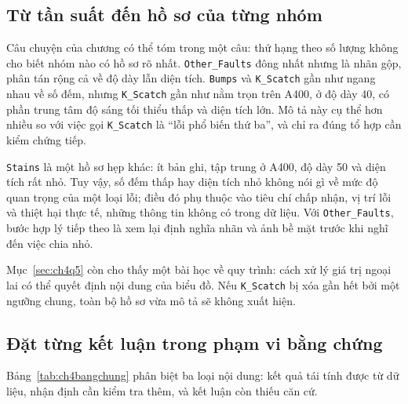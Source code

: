 \documentclass[12pt,a4paper,oneside]{report}
\newcommand{\maCot}[1]{{\urlstyle{tt}\def\UrlBreaks{\do\_\do\/\do\.}\def\UrlBigBreaks{}\nolinkurl{#1}}}
\begin{document}
\subsection{Từ tần suất đến hồ sơ của từng nhóm}

Câu chuyện của chương có thể tóm trong một câu: thứ hạng theo số lượng không cho biết nhóm nào có hồ sơ rõ nhất. \maCot{Other_Faults} đông nhất nhưng là nhãn gộp, phân tán rộng cả về độ dày lẫn diện tích. \maCot{Bumps} và \maCot{K_Scatch} gần như ngang nhau về số đếm, nhưng \maCot{K_Scatch} gần như nằm trọn trên A400, ở độ dày 40, có phần trung tâm độ sáng tối thiểu thấp và diện tích lớn. Mô tả này cụ thể hơn nhiều so với việc gọi \maCot{K_Scatch} là ``lỗi phổ biến thứ ba'', và chỉ ra đúng tổ hợp cần kiểm chứng tiếp.

\maCot{Stains} là một hồ sơ hẹp khác: ít bản ghi, tập trung ở A400, độ dày 50 và diện tích rất nhỏ. Tuy vậy, số đếm thấp hay diện tích nhỏ không nói gì về mức độ quan trọng của một loại lỗi; điều đó phụ thuộc vào tiêu chí chấp nhận, vị trí lỗi và thiệt hại thực tế, những thông tin không có trong dữ liệu. Với \maCot{Other_Faults}, bước hợp lý tiếp theo là xem lại định nghĩa nhãn và ảnh bề mặt trước khi nghĩ đến việc chia nhỏ.

Mục~\ref{sec:ch4q5} còn cho thấy một bài học về quy trình: cách xử lý giá trị ngoại lai có thể quyết định nội dung của biểu đồ. Nếu \maCot{K_Scatch} bị xóa gần hết bởi một ngưỡng chung, toàn bộ hồ sơ vừa mô tả sẽ không xuất hiện.

\subsection{Đặt từng kết luận trong phạm vi bằng chứng}

Bảng~\ref{tab:ch4bangchung} phân biệt ba loại nội dung: kết quả tái tính được từ dữ liệu, nhận định cần kiểm tra thêm, và kết luận còn thiếu căn cứ.
\end{document}
